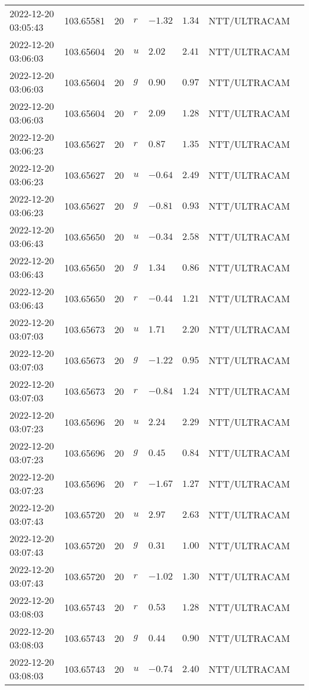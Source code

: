 \documentclass{nature_plusfigure}
\begin{document}
\begin{supplement}
\begin{center}
\begin{longtable}{llllllll}
2022-12-20 03:05:43 & 103.65581 & 20 & $r$ & $-1.32$ & $1.34$ & NTT/ULTRACAM &  \\ 
2022-12-20 03:06:03 & 103.65604 & 20 & $u$ & $2.02$ & $2.41$ & NTT/ULTRACAM &  \\ 
2022-12-20 03:06:03 & 103.65604 & 20 & $g$ & $0.90$ & $0.97$ & NTT/ULTRACAM &  \\ 
2022-12-20 03:06:03 & 103.65604 & 20 & $r$ & $2.09$ & $1.28$ & NTT/ULTRACAM &  \\ 
2022-12-20 03:06:23 & 103.65627 & 20 & $r$ & $0.87$ & $1.35$ & NTT/ULTRACAM &  \\ 
2022-12-20 03:06:23 & 103.65627 & 20 & $u$ & $-0.64$ & $2.49$ & NTT/ULTRACAM &  \\ 
2022-12-20 03:06:23 & 103.65627 & 20 & $g$ & $-0.81$ & $0.93$ & NTT/ULTRACAM &  \\ 
2022-12-20 03:06:43 & 103.65650 & 20 & $u$ & $-0.34$ & $2.58$ & NTT/ULTRACAM &  \\ 
2022-12-20 03:06:43 & 103.65650 & 20 & $g$ & $1.34$ & $0.86$ & NTT/ULTRACAM &  \\ 
2022-12-20 03:06:43 & 103.65650 & 20 & $r$ & $-0.44$ & $1.21$ & NTT/ULTRACAM &  \\ 
2022-12-20 03:07:03 & 103.65673 & 20 & $u$ & $1.71$ & $2.20$ & NTT/ULTRACAM &  \\ 
2022-12-20 03:07:03 & 103.65673 & 20 & $g$ & $-1.22$ & $0.95$ & NTT/ULTRACAM &  \\ 
2022-12-20 03:07:03 & 103.65673 & 20 & $r$ & $-0.84$ & $1.24$ & NTT/ULTRACAM &  \\ 
2022-12-20 03:07:23 & 103.65696 & 20 & $u$ & $2.24$ & $2.29$ & NTT/ULTRACAM &  \\ 
2022-12-20 03:07:23 & 103.65696 & 20 & $g$ & $0.45$ & $0.84$ & NTT/ULTRACAM &  \\ 
2022-12-20 03:07:23 & 103.65696 & 20 & $r$ & $-1.67$ & $1.27$ & NTT/ULTRACAM &  \\ 
2022-12-20 03:07:43 & 103.65720 & 20 & $u$ & $2.97$ & $2.63$ & NTT/ULTRACAM &  \\ 
2022-12-20 03:07:43 & 103.65720 & 20 & $g$ & $0.31$ & $1.00$ & NTT/ULTRACAM &  \\ 
2022-12-20 03:07:43 & 103.65720 & 20 & $r$ & $-1.02$ & $1.30$ & NTT/ULTRACAM &  \\ 
2022-12-20 03:08:03 & 103.65743 & 20 & $r$ & $0.53$ & $1.28$ & NTT/ULTRACAM &  \\ 
2022-12-20 03:08:03 & 103.65743 & 20 & $g$ & $0.44$ & $0.90$ & NTT/ULTRACAM &  \\ 
2022-12-20 03:08:03 & 103.65743 & 20 & $u$ & $-0.74$ & $2.40$ & NTT/ULTRACAM &  \\ 

\end{longtable}
\end{center}
\end{supplement}
\end{document}
